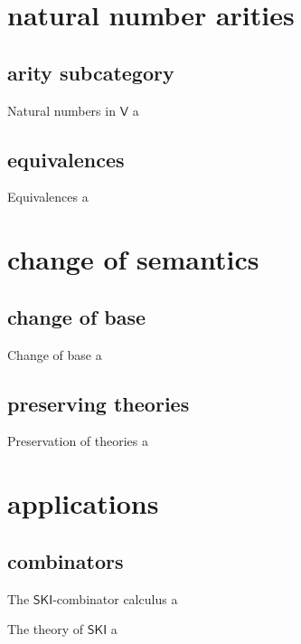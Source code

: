\documentclass{beamer}
\begin{document}
\section{natural number arities}
\subsection{arity subcategory}
\begin{frame}{Natural numbers in $\mathsf{V}$}
  a
\end{frame}
\subsection{equivalences}
\begin{frame}{Equivalences}
  a
\end{frame}

\section{change of semantics}
\subsection{change of base}
\begin{frame}{Change of base}
  a
\end{frame}
\subsection{preserving theories}
\begin{frame}{Preservation of theories}
  a
\end{frame}

  

\section{applications}
\subsection{combinators}
\begin{frame}{The $\mathsf{SKI}$-combinator calculus}
  a
\end{frame}
\begin{frame}{The theory of $\mathsf{SKI}$}
  a
\end{frame}
\end{document}
